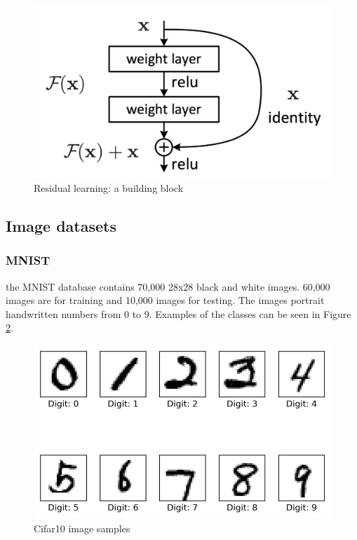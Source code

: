 \documentclass[conference]{IEEEtran}
\begin{document}
\begin{figure}[!htbp]
    \centering
    \includegraphics[scale=0.2]{img/residual block.png}
    \caption{Residual learning: a building block \cite{he_deep_2015}}
    \label{fig:x resblock}
\end{figure}


\subsection{Image datasets}
\subsubsection{MNIST}
the MNIST database contains 70,000 28x28 black and white images. 
60,000 images are for training and 10,000 images for testing. 
The images portrait handwritten numbers from 0 to 9. \cite{yann_lecun_mnist_nodate} 
Examples of the classes can be seen in Figure \ref{fig:x MNIST image samples}.
\begin{figure}[!htbp]
    \centering
    \includegraphics[scale=0.35]{img/mnist_sample.jpeg}
    \caption{Cifar10 image samples \cite{noauthor_convolutional_nodate}}
    \label{fig:x MNIST image samples}
\end{figure}
\end{document}
